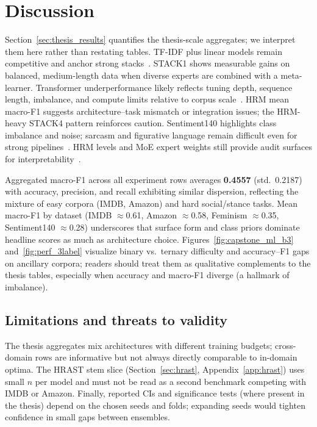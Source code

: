 \section{Discussion}
\label{sec:discuss}

Section~\ref{sec:thesis_results} quantifies the thesis-scale aggregates; we interpret them here rather than restating tables. TF-IDF plus linear models remain competitive and anchor strong stacks~\cite{ref33,ref35}. STACK1 shows measurable gains on balanced, medium-length data when diverse experts are combined with a meta-learner. Transformer underperformance likely reflects tuning depth, sequence length, imbalance, and compute limits relative to corpus scale~\cite{ref03,ref34}. HRM mean macro-F1 suggests architecture--task mismatch or integration issues; the HRM-heavy STACK4 pattern reinforces caution. Sentiment140 highlights class imbalance and noise; sarcasm and figurative language remain difficult even for strong pipelines~\cite{ref36}. HRM levels and MoE expert weights still provide audit surfaces for interpretability~\cite{ref04,ref08}.

Aggregated macro-F1 across all experiment rows averages \textbf{0.4557} (std.\ 0.2187) with accuracy, precision, and recall exhibiting similar dispersion, reflecting the mixture of easy corpora (IMDB, Amazon) and hard social/stance tasks. Mean macro-F1 by dataset (IMDB $\approx$0.61, Amazon $\approx$0.58, Feminism $\approx$0.35, Sentiment140 $\approx$0.28) underscores that surface form and class priors dominate headline scores as much as architecture choice. Figures~\ref{fig:capstone_ml_b3} and~\ref{fig:perf_3label}  visualize binary vs.\ ternary difficulty and accuracy--F1 gaps on ancillary corpora; readers should treat them as qualitative complements to the thesis tables, especially when accuracy and macro-F1 diverge (a hallmark of imbalance).

\subsection{Limitations and threats to validity}
The thesis aggregates mix architectures with different training budgets; cross-domain rows are informative but not always directly comparable to in-domain optima. The HRAST stem slice (Section~\ref{sec:hrast}, Appendix~\ref{app:hrast}) uses small $n$ per model and must not be read as a second benchmark competing with IMDB or Amazon. Finally, reported CIs and significance tests (where present in the thesis) depend on the chosen seeds and folds; expanding seeds would tighten confidence in small gaps between ensembles.
